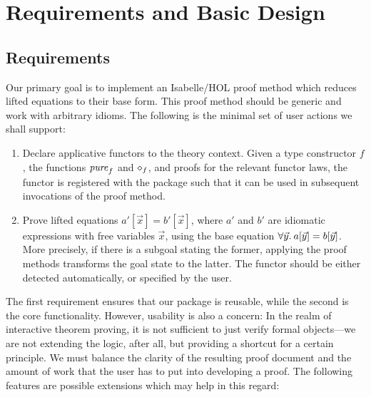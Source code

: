 \chapter{Requirements and Basic Design}\label{sec:design}

\section{Requirements}\label{subsec:requirements}

Our primary goal is to implement an Isabelle/HOL proof method which reduces
lifted equations to their base form.
This proof method should be generic and work with arbitrary idioms.
The following is the minimal set of user actions we shall support:

\begin{enumerate}
\item Declare applicative functors to the theory context.
	Given a type constructor $f$, the functions $\operatorname{\mathit{pure}}_f$ and $\diamond_f$, and
	proofs for the relevant functor laws, the functor is registered with the
	package such that it can be used in subsequent invocations of the
	proof method.
\item Prove lifted equations $a'[\vec{x}] = b'[\vec{x}]$, where $a'$ and $b'$
	are idiomatic expressions with free variables $\vec{x}$, using the base
	equation $\forall \vec{y}.\>a[\vec{y}] = b[\vec{y}]$.
	More precisely, if there is a subgoal stating the former, applying the
	proof methods transforms the goal state to the latter.
	The functor should be either detected automatically, or specified by
	the user.
\end{enumerate}

The first requirement ensures that our package is reusable, while the second
is the core functionality.
However, usability is also a concern: In the realm of interactive theorem
proving, it is not sufficient to just verify formal objects---we are not
extending the logic, after all, but providing a shortcut for a certain
principle.
We must balance the clarity of the resulting proof document and the amount of
work that the user has to put into developing a proof.
The following features are possible extensions which may help in this regard:

